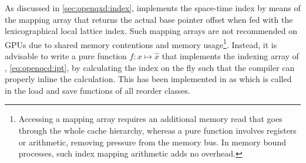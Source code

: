 

As discussed in \cref{sec:openqxd:index}, \openqxd implements the space-time index by means of the mapping array  that returns the actual base pointer offset when fed with the lexicographical local lattice index.
Such mapping arrays are not recommended on GPUs due to shared memory contentions and memory usage\footnote{
Accessing a mapping array requires an additional memory read that goes through the whole cache hierarchy, whereas a pure function involves registers or arithmetic, removing pressure from the memory bus.
In memory bound processes, such index mapping arithmetic adds no overhead.
}.
Instead, it is advisable to write a pure function $f \colon x \mapsto \hat{x}$ that implements the indexing array of \openqxd, \cref{eq:openqcd:ipt}, by calculating the index on the fly such that the compiler can properly inline the calculation.
This has been implemented in \quda as  which is called in the load and save functions of all reorder classes.




